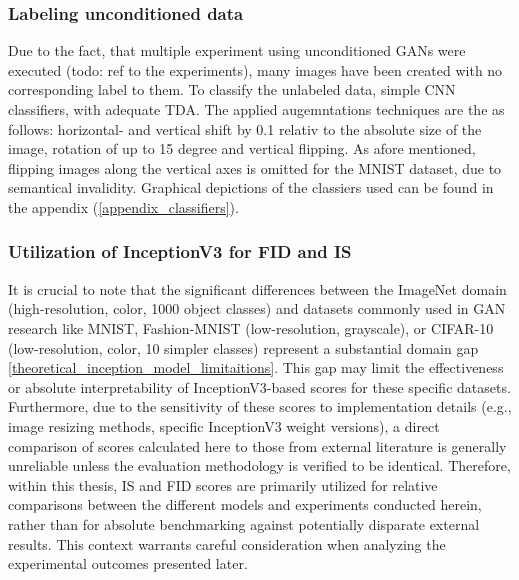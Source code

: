 \subsubsection{Labeling unconditioned data}\label{body_experiment_labeling_data}
Due to the fact, that multiple experiment using unconditioned GANs were executed (todo: ref to the experiments), many images have been created with no corresponding label to them. To classify the unlabeled data, simple CNN classifiers, with adequate TDA. The applied augemntations techniques are the as follows: horizontal- and vertical shift by 0.1 relativ to the absolute size of the image, rotation of up to 15 degree and vertical flipping. As afore mentioned, flipping images along the vertical axes is omitted for the MNIST dataset, due to semantical invalidity. Graphical depictions of the classiers used can be found in the appendix (\ref{appendix_classifiers}).\\


\subsubsection{Utilization of InceptionV3 for FID and IS}\label{body_experiment_inception_model}
It is crucial to note that the significant differences between the ImageNet domain (high-resolution, color, 1000 object classes) and datasets commonly used in GAN research like MNIST, Fashion-MNIST (low-resolution, grayscale), or CIFAR-10 (low-resolution, color, 10 simpler classes) represent a substantial domain gap \ref{theoretical_inception_model_limitaitions}. This gap may limit the effectiveness or absolute interpretability of InceptionV3-based scores for these specific datasets. Furthermore, due to the sensitivity of these scores to implementation details (e.g., image resizing methods, specific InceptionV3 weight versions), a direct comparison of scores calculated here to those from external literature is generally unreliable unless the evaluation methodology is verified to be identical. Therefore, within this thesis, IS and FID scores are primarily utilized for relative comparisons between the different models and experiments conducted herein, rather than for absolute benchmarking against potentially disparate external results. This context warrants careful consideration when analyzing the experimental outcomes presented later.


